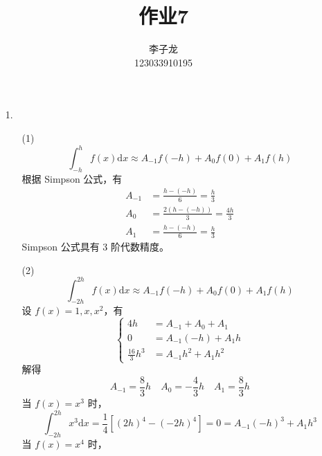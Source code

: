 \documentclass{sjtuarticle}
\title{作业7}
\author{李子龙\\123033910195}
\def\dd{\mathrm{d}}
\begin{document}
\maketitle


\begin{itemize}
    \item[1.] \begin{solution}
    \begin{itemize}
        \item[(1)]
        \begin{equation*}
            \int_{-h}^h f(x)\dd x\approx A_{-1}f(-h)+A_0f(0)+A_1f(h)
        \end{equation*}
        根据 Simpson 公式，有
        \begin{align*}
            A_{-1} &= \frac{h-(-h)}{6} =\frac{h}{3} \\
            A_0 &= \frac{2(h-(-h))}{3} = \frac{4h}{3} \\
            A_1 &= \frac{h-(-h)}{6} = \frac{h}{3}
        \end{align*}
        Simpson 公式具有 3 阶代数精度。
        \item[(2)]
        \begin{equation*}
            \int_{-2h}^{2h}f(x)\dd x\approx A_{-1}f(-h)+A_0f(0)+A_1f(h)
        \end{equation*}
        设 $f(x)=1,x,x^2$，有
        \begin{equation*}
            \left\{
                \begin{aligned}
                4h &= A_{-1}+A_0+A_1 \\
                0 &= A_{-1}(-h)+A_1h \\
                \frac{16}{3}h^3 &= A_{-1}h^2+A_1h^2
                \end{aligned}
            \right.
        \end{equation*}
        解得
        \begin{equation*}
            A_{-1}=\frac{8}{3}h \quad A_0 = -\frac{4}{3}h \quad A_1 = \frac{8}{3}h
        \end{equation*}
        当 $f(x)=x^3$ 时，
        \begin{equation*}
            \int_{-2h}^{2h}x^3\dd x=\frac{1}{4}[(2h)^4-(-2h)^4]=0=A_{-1}(-h)^3+A_1h^3
        \end{equation*}
        当 $f(x)=x^4$ 时，
        \begin{equation*}

\end{equation*}
\end{itemize}
\end{solution}
\end{itemize}
\end{document}
